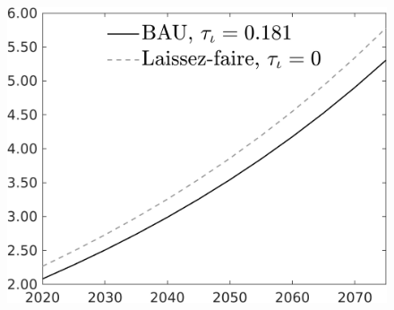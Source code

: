 \documentclass[12pt]{article}
\begin{document}
\begin{figure}[h!!]
\begin{minipage}[]{0.32\textwidth}
	\end{minipage}	
	\begin{minipage}[]{0.32\textwidth}
		\includegraphics[width=1\textwidth]{../../codding_model/own_basedOnFried/optimalPol_010922_revision/figures/all_13Sept22/CompTaul_Equlab_LFBAU_Reg0_N_spillover0_nsk1_xgr0_knspil0_sep1_countec0_GovRev0_etaa0.79_lgd1.png}
	\end{minipage}	
\end{figure}
\end{document}
